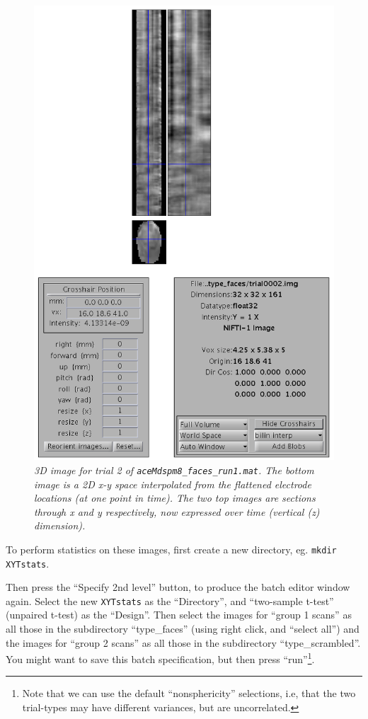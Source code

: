\begin{figure}
\begin{center}
\includegraphics[width=120mm]{multimodal/figures/eeg_scalptime}
\caption{\em 3D image for trial 2 of \texttt{aceMdspm8\_faces\_run1.mat}. The bottom image is a 2D x-y space interpolated from the flattened electrode locations (at one point in time). The two top images are sections through x and y respectively, now expressed over time (vertical (z) dimension).\label{multimodal:fig:6}}
\end{center}
\end{figure}

To perform statistics on these images, first create a new directory, eg. \texttt{mkdir XYTstats}.

Then press the ``Specify 2nd level'' button, to produce the batch editor window again. Select the new \texttt{XYTstats} as the ``Directory'', and ``two-sample t-test'' (unpaired t-test) as the ``Design''. Then select the images for ``group 1 scans'' as all those in the subdirectory ``type\_faces'' (using right click, and ``select all'') and the images for ``group 2 scans'' as all those in the subdirectory ``type\_scrambled''. You might want to save this batch specification, but then press ``run''\footnote{Note that we can use the default ``nonsphericity'' selections, i.e, that the two trial-types may have different variances, but are uncorrelated.}.

